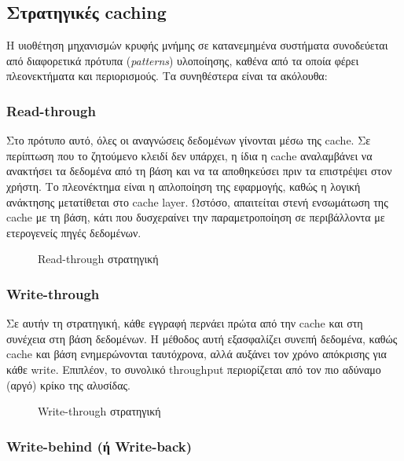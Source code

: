 \subsection{Στρατηγικές caching}

Η υιοθέτηση μηχανισμών κρυφής μνήμης σε κατανεμημένα συστήματα συνοδεύεται από
διαφορετικά πρότυπα (\textit{patterns}) υλοποίησης, καθένα από τα οποία φέρει
πλεονεκτήματα και περιορισμούς. Τα συνηθέστερα είναι τα ακόλουθα:

\subsubsection{Read-through}

Στο πρότυπο αυτό, όλες οι αναγνώσεις δεδομένων γίνονται μέσω της cache. Σε
περίπτωση που το ζητούμενο κλειδί δεν υπάρχει, η ίδια η cache αναλαμβάνει να
ανακτήσει τα δεδομένα από τη βάση και να τα αποθηκεύσει πριν τα επιστρέψει στον
χρήστη. Το πλεονέκτημα είναι η απλοποίηση της εφαρμογής, καθώς η λογική
ανάκτησης μετατίθεται στο cache layer. Ωστόσο, απαιτείται στενή ενσωμάτωση της
cache με τη βάση, κάτι που δυσχεραίνει την παραμετροποίηση σε περιβάλλοντα με
ετερογενείς πηγές δεδομένων.

\begin{figure}[H]
	\centering
	\makebox[\textwidth]{%
	}
	\caption{Read-through στρατηγική}
	\label{fig:read-through}
\end{figure}

\subsubsection{Write-through}

Σε αυτήν τη στρατηγική, κάθε εγγραφή περνάει πρώτα από την cache και στη
συνέχεια στη βάση δεδομένων. Η μέθοδος αυτή εξασφαλίζει συνεπή δεδομένα, καθώς
cache και βάση ενημερώνονται ταυτόχρονα, αλλά αυξάνει τον χρόνο απόκρισης για
κάθε write. Επιπλέον, το συνολικό throughput περιορίζεται από τον πιο αδύναμο
(αργό) κρίκο της αλυσίδας.

\begin{figure}[H]
	\centering
	\makebox[\textwidth]{%
	}
	\caption{Write-through στρατηγική}
	\label{fig:write-through}
\end{figure}

\subsubsection{Write-behind (ή Write-back)}

